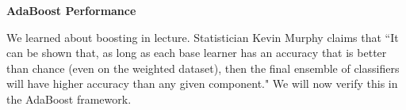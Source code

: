 \item {} {\bf AdaBoost Performance}

We learned about boosting in lecture. Statistician Kevin Murphy claims that ``It can be shown that, as long as each base learner has an accuracy that is better than chance (even on the weighted dataset), then the final ensemble of classifiers will have higher accuracy than any given component." We will now verify this in the AdaBoost framework.


\begin{enumerate}
    
    
	\ifnum{} {
	
        } \fi
        
    
    
	\ifnum{} {
	
        } \fi
        
    
    
	\ifnum{} {
	
        } \fi
        
\end{enumerate}
